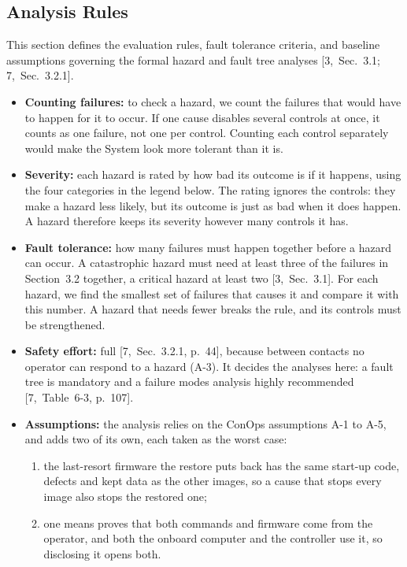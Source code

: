 \documentclass[11pt,a4paper]{article}
\begin{document}
\subsection{Analysis Rules}
This section defines the evaluation rules, fault tolerance criteria, and
baseline assumptions governing the formal hazard and fault tree analyses
[3,~Sec.~3.1; 7,~Sec.~3.2.1].

\begin{itemize}
\item \textbf{Counting failures:} to check a hazard, we count the failures
  that would have to happen for it to occur. If one cause disables several
  controls at once, it counts as one failure, not one per control. Counting
  each control separately would make the System look more tolerant than it is.
\item \textbf{Severity:} each hazard is rated by how bad its outcome is if it
  happens, using the four categories in the legend below. The rating ignores
  the controls: they make a hazard less likely, but its outcome is just as bad
  when it does happen. A hazard therefore keeps its severity however many
  controls it has.
\item \textbf{Fault tolerance:} how many failures must happen together before a
  hazard can occur. A catastrophic hazard must need at least three of the
  failures in Section~3.2 together, a critical hazard at least two
  [3,~Sec.~3.1]. For each hazard, we find the smallest set of
  failures that causes it and compare it with this number. A hazard that needs
  fewer breaks the rule, and its controls must be strengthened.
\item \textbf{Safety effort:} full [7,~Sec.~3.2.1, p.~44], because between
  contacts no operator can respond to a hazard (A-3). It decides the analyses
  here: a fault tree is mandatory and a failure modes analysis highly
  recommended [7,~Table~6-3, p.~107].
\item \textbf{Assumptions:} the analysis relies on the ConOps assumptions A-1 to
  A-5, and adds two of its own, each taken as the worst case:
  \begin{enumerate}[nosep, leftmargin=1.8em]
  \item the last-resort firmware the restore puts back has the same start-up
    code, defects and kept data as the other images, so a cause that stops
    every image also stops the restored one;
  \item one means proves that both commands and firmware come from the
    operator, and both the onboard computer and the controller use it, so
    disclosing it opens both.
  \end{enumerate}
\end{itemize}
\end{document}
